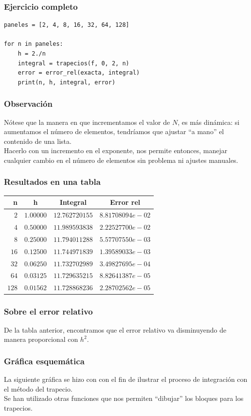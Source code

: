 \documentclass[12pt]{beamer}
\begin{document}
\begin{frame}[fragile]
\frametitle{Ejercicio completo}
\begin{lstlisting}[caption=Completamos el código y evaluamos el error]
paneles = [2, 4, 8, 16, 32, 64, 128]

for n in paneles:
    h = 2./n
    integral = trapecios(f, 0, 2, n)
    error = error_rel(exacta, integral)
    print(n, h, integral, error)
\end{lstlisting}
\end{frame}
\begin{frame}
\frametitle{Observación}
Nótese que la manera en que incrementamos el valor de $N$, es más dinámica: \pause si aumentamos el número de elementos, tendríamos que ajustar \enquote{a mano} el contenido de una lista.
\\
\bigskip
\pause 
Hacerlo con un incremento en el exponente, nos permite entonces, manejar cualquier cambio en el número de elementos sin problema ni ajustes manuales.
\end{frame}
\begin{frame}
\frametitle{Resultados en una tabla}
\begin{table}
\centering
\renewcommand{\arraystretch}{0.9}
\begin{tabular}{r | c | c | c} \hline
n & h & Integral & Error rel \\ \hline
$2$ & $1.00000$ & $12.762720155$ & $8.81708094e-02$ \\ \hline
$4$ & $0.50000$ & $11.989593838$ & $2.22527700e-02$ \\ \hline
$8$ & $0.25000$ & $11.794011288$ & $5.57707550e-03$ \\ \hline
$16$ & $0.12500$ & $11.744971839$ & $1.39589033e-03$ \\ \hline
$32$ & $0.06250$ & $11.732702989$ & $3.49827695e-04$ \\ \hline
$64$ & $0.03125$ & $11.729635215$ & $8.82641387e-05$ \\ \hline
$128$ & $0.01562$ & $11.728868236$ & $2.28702562e-05$ \\ \hline
\hline
\end{tabular}
\end{table}
\end{frame}
\begin{frame}
\frametitle{Sobre el error relativo}
De la tabla anterior, encontramos que el error relativo va disminuyendo de manera proporcional con $h^{2}$.
\end{frame}
\begin{frame}
\frametitle{Gráfica esquemática}
La siguiente gráfica se hizo con  con el fin de ilustrar el proceso de integración con el método del trapecio.
\\
\bigskip
\pause
Se han utilizado otras funciones que nos permiten \enquote{dibujar} los bloques para los trapecios.
\end{frame}
\end{document}
